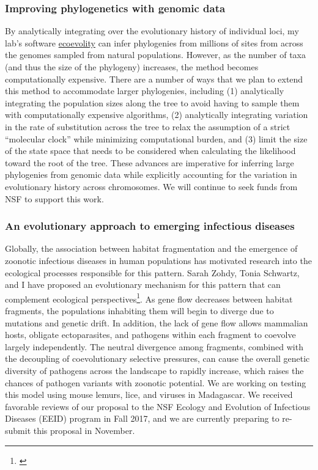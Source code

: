 \subsubsection*{Improving phylogenetics with genomic data}
By analytically integrating over the evolutionary history of individual loci,
my lab's software
\href{http://phyletica.org/ecoevolity/}{ecoevolity}
can infer phylogenies from millions of sites from across the genomes sampled
from natural populations.
However, as the number of taxa (and thus the size of the phylogeny) increases,
the method becomes computationally expensive.
There are a number of ways that we plan to extend this method to accommodate
larger phylogenies, including
(1) analytically integrating the population sizes along the tree to
avoid having to sample them with computationally expensive algorithms,
(2) analytically integrating variation in the rate of substitution
across the tree to relax the assumption of a strict ``molecular clock'' while
minimizing computational burden,
and
(3) limit the size of the state space that needs to be considered when
calculating the likelihood toward the root of the tree.
These advances are imperative for inferring large phylogenies from genomic data
while explicitly accounting for the variation in evolutionary history across
chromosomes.
We will continue to seek funds from NSF to support this work.

\subsubsection*{An evolutionary approach to emerging infectious diseases}
Globally, the association between habitat fragmentation and the emergence of
zoonotic infectious diseases in human populations has motivated research into
the ecological processes responsible for this pattern.
Sarah Zohdy, Tonia Schwartz, and I have proposed an evolutionary mechanism for
this pattern that can complement ecological
perspectives\footnote{\label{Zohdy19}\hspace{-0.6em}}.
As gene flow decreases between habitat fragments, the populations inhabiting
them will begin to diverge due to mutations and genetic drift.
In addition, the lack of gene flow allows mammalian hosts, obligate
ectoparasites, and pathogens within each fragment to coevolve largely
independently.
The neutral divergence among fragments, combined with the decoupling of
coevolutionary selective pressures, can cause the overall genetic
diversity of pathogens across the landscape to rapidly increase,
which raises the chances of pathogen variants with zoonotic potential.
We are working on testing this model using mouse lemurs, lice, and viruses in
Madagascar.
We received favorable reviews of our proposal to the NSF Ecology and Evolution
of Infectious Diseases (EEID) program in Fall 2017, and we are currently
preparing to re-submit this proposal in November.

